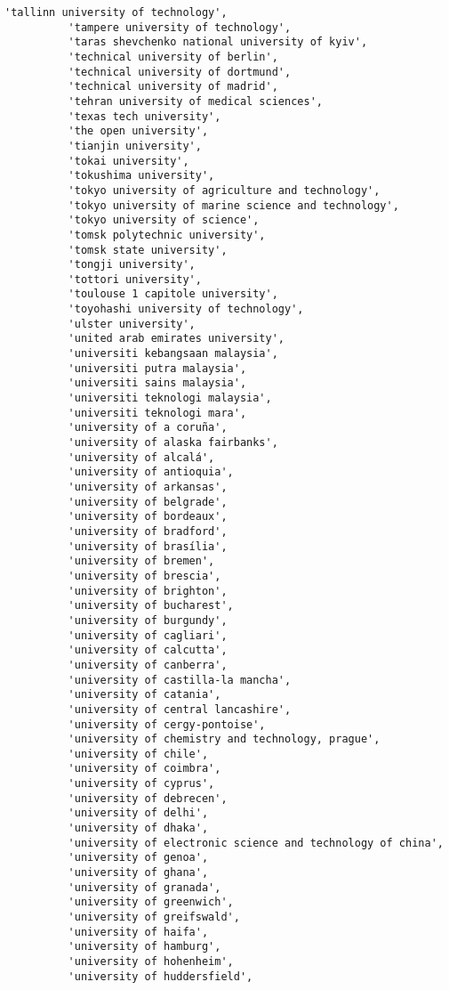 \documentclass[11pt]{article}
\begin{document}
\begin{Verbatim}[commandchars=\\\{\}]
          'tallinn university of technology',
          'tampere university of technology',
          'taras shevchenko national university of kyiv',
          'technical university of berlin',
          'technical university of dortmund',
          'technical university of madrid',
          'tehran university of medical sciences',
          'texas tech university',
          'the open university',
          'tianjin university',
          'tokai university',
          'tokushima university',
          'tokyo university of agriculture and technology',
          'tokyo university of marine science and technology',
          'tokyo university of science',
          'tomsk polytechnic university',
          'tomsk state university',
          'tongji university',
          'tottori university',
          'toulouse 1 capitole university',
          'toyohashi university of technology',
          'ulster university',
          'united arab emirates university',
          'universiti kebangsaan malaysia',
          'universiti putra malaysia',
          'universiti sains malaysia',
          'universiti teknologi malaysia',
          'universiti teknologi mara',
          'university of a coruña',
          'university of alaska fairbanks',
          'university of alcalá',
          'university of antioquia',
          'university of arkansas',
          'university of belgrade',
          'university of bordeaux',
          'university of bradford',
          'university of brasília',
          'university of bremen',
          'university of brescia',
          'university of brighton',
          'university of bucharest',
          'university of burgundy',
          'university of cagliari',
          'university of calcutta',
          'university of canberra',
          'university of castilla-la mancha',
          'university of catania',
          'university of central lancashire',
          'university of cergy-pontoise',
          'university of chemistry and technology, prague',
          'university of chile',
          'university of coimbra',
          'university of cyprus',
          'university of debrecen',
          'university of delhi',
          'university of dhaka',
          'university of electronic science and technology of china',
          'university of genoa',
          'university of ghana',
          'university of granada',
          'university of greenwich',
          'university of greifswald',
          'university of haifa',
          'university of hamburg',
          'university of hohenheim',
          'university of huddersfield',

\end{Verbatim}
\end{document}
